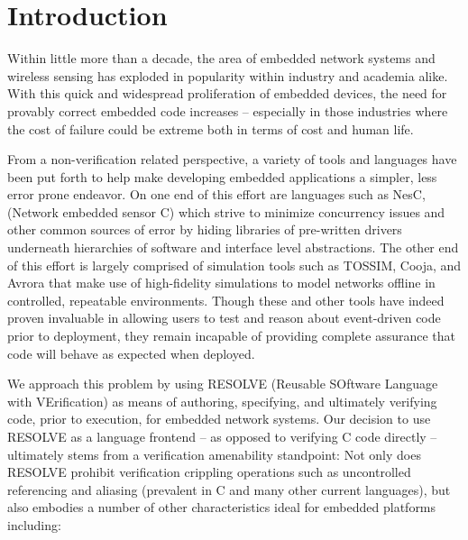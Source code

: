 \section{Introduction}
\label{sec:intro}
Within little more than a decade, the area of embedded network systems and wireless sensing has exploded in popularity within industry and academia alike. With this quick and widespread proliferation of embedded devices, the need for provably correct embedded code increases -- especially in those industries where the cost of failure could be extreme both in terms of cost and human life. 

From a non-verification related perspective, a variety of tools and languages have been put forth to help make developing embedded applications a simpler, less error prone endeavor. On one end of this effort are languages such as NesC\cite{Gay:2003}, (Network embedded sensor C) which strive to minimize concurrency issues and other common sources of error by hiding libraries of pre-written drivers underneath hierarchies of software and interface level abstractions. The other end of this effort is largely comprised of simulation tools such as TOSSIM\cite{levis:2003}, Cooja\cite{osterlind:2006}, and Avrora that make use of high-fidelity simulations to model networks offline in controlled, repeatable environments. Though these and other tools have indeed proven invaluable in allowing users to test and reason about event-driven code prior to deployment, they remain incapable of providing complete assurance that code will behave as expected when deployed.

We approach this problem by using RESOLVE (Reusable SOftware Language with VErification) as means of authoring, specifying, and ultimately verifying code, prior to execution, for embedded network systems. Our decision to use RESOLVE as a language frontend -- as opposed to verifying C code directly -- ultimately stems from a verification amenability standpoint: Not only does RESOLVE prohibit verification crippling operations such as uncontrolled referencing and aliasing (prevalent in C and many other current languages)\cite{kulczycki:2004}, but also embodies a number of other characteristics ideal for embedded platforms including:

